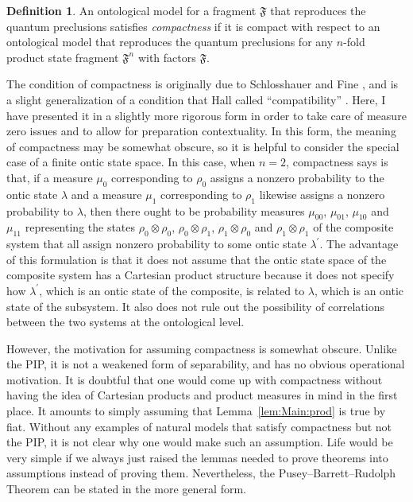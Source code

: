 \documentclass[DIV=calc,fontsize=12pt]{scrartcl} %
\theoremstyle{definition}
\newtheorem{definition}{Definition}[section]
\theoremstyle{plain}
\begin{document}
\begin{definition}
An ontological model for a fragment $\mathfrak{F}$ that reproduces
the quantum preclusions satisfies \emph{compactness} if it is
compact with respect to an ontological model that reproduces the
quantum preclusions for any $n$-fold product state fragment
$\mathfrak{F}^n$ with factors $\mathfrak{F}$.
\end{definition}

The condition of compactness is originally due to Schlosshauer and
Fine \cite{Schlosshauer2012}, and is a slight generalization of a
condition that Hall called ``compatibility'' \cite{Hall2011}.  Here, I
have presented it in a slightly more rigorous form in order to take
care of measure zero issues and to allow for preparation
contextuality.  In this form, the meaning of compactness may be
somewhat obscure, so it is helpful to consider the special case of a
finite ontic state space.  In this case, when $n=2$, compactness says
is that, if a measure $\mu_0$ corresponding to $\rho_0$ assigns a
nonzero probability to the ontic state $\lambda$ and a measure $\mu_1$
corresponding to $\rho_1$ likewise assigns a nonzero probability to
$\lambda$, then there ought to be probability measures $\mu_{00}$,
$\mu_{01}$, $\mu_{10}$ and $\mu_{11}$ representing the states $\rho_0
\otimes \rho_0$, $\rho_0 \otimes \rho_1$, $\rho_1 \otimes \rho_0$ and
$\rho_1 \otimes \rho_1$ of the composite system that all assign
nonzero probability to some ontic state $\lambda^{\prime}$.  The
advantage of this formulation is that it does not assume that the
ontic state space of the composite system has a Cartesian product
structure because it does not specify how $\lambda^{\prime}$, which is
an ontic state of the composite, is related to $\lambda$, which is an
ontic state of the subsystem.  It also does not rule out the
possibility of correlations between the two systems at the ontological
level.

However, the motivation for assuming compactness is somewhat obscure.
Unlike the PIP, it is not a weakened form of separability, and has no
obvious operational motivation.  It is doubtful that one would come up
with compactness without having the idea of Cartesian products and
product measures in mind in the first place.  It amounts to simply
assuming that Lemma~\ref{lem:Main:prod} is true by fiat.  Without any
examples of natural models that satisfy compactness but not the PIP,
it is not clear why one would make such an assumption.  Life would be
very simple if we always just raised the lemmas needed to prove
theorems into assumptions instead of proving them.  Nevertheless, the
Pusey--Barrett--Rudolph Theorem can be stated in the more general form.
\end{document}
